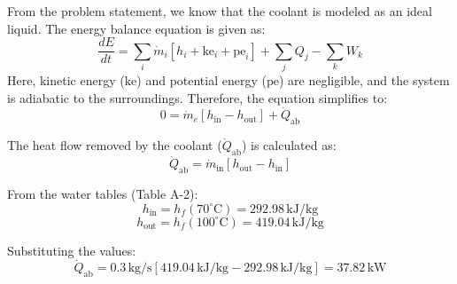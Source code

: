 From the problem statement, we know that the coolant is modeled as an ideal liquid. The energy balance equation is given as:  
\[
\frac{dE}{dt} = \sum_i \dot{m}_i \left[ h_i + \text{ke}_i + \text{pe}_i \right] + \sum_j Q_j - \sum_k W_k
\]  
Here, kinetic energy (\( \text{ke} \)) and potential energy (\( \text{pe} \)) are negligible, and the system is adiabatic to the surroundings. Therefore, the equation simplifies to:  
\[
0 = \dot{m}_e \left[ h_{\text{in}} - h_{\text{out}} \right] + \dot{Q}_{\text{ab}}
\]  

The heat flow removed by the coolant (\( \dot{Q}_{\text{ab}} \)) is calculated as:  
\[
\dot{Q}_{\text{ab}} = \dot{m}_{\text{in}} \left[ h_{\text{out}} - h_{\text{in}} \right]
\]  

From the water tables (Table A-2):  
\[
h_{\text{in}} = h_f(70^\circ\text{C}) = 292.98 \, \text{kJ/kg}  
\]  
\[
h_{\text{out}} = h_f(100^\circ\text{C}) = 419.04 \, \text{kJ/kg}  
\]  

Substituting the values:  
\[
\dot{Q}_{\text{ab}} = 0.3 \, \text{kg/s} \left[ 419.04 \, \text{kJ/kg} - 292.98 \, \text{kJ/kg} \right] = 37.82 \, \text{kW}
\]